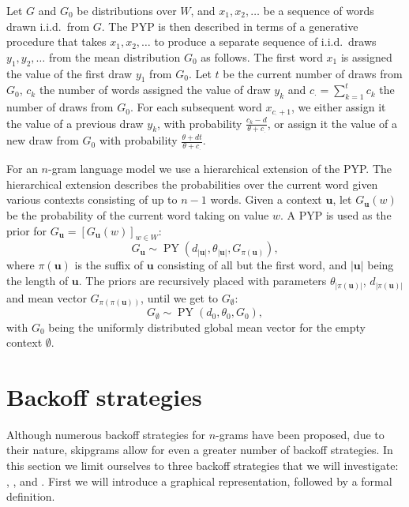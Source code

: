   Let $G$ and $G_0$ be distributions over $W$, and $x_1,x_2,\ldots$ be a sequence of words drawn i.i.d.\ from $G$. The PYP is then described in terms of a generative procedure that takes  $x_1,x_2,\ldots$ to produce a separate sequence of i.i.d.\ draws $y_1,y_2,\ldots$ from the mean distribution $G_0$ as follows. The first word $x_1$ is assigned the value of the first draw $y_1$ from $G_0$. Let $t$ be the current number of draws from $G_0$, $c_k$ the number of words assigned the value of draw $y_k$ and $c_\cdot = \sum^t_{k=1}c_k$ the number of draws from $G_0$. For each subsequent word $x_{c_\cdot+1}$, we either assign it the value of a previous draw $y_k$, with probability $\frac{c_k-d}{\theta+c_\cdot}$, or assign it the value of a new draw from $G_0$ with probability $\frac{\theta+dt}{\theta+c_\cdot}$.

For an $n$-gram language model we use a hierarchical extension of the PYP. The hierarchical extension describes the probabilities over the current word given various contexts consisting of up to $n-1$ words. Given a context $\mathbf{u}$, let $G_\mathbf{u}(w)$ be the probability of the current word taking on value $w$. A PYP is used as the prior for $G_\mathbf{u}=[G_\mathbf{u}(w)]_{w\in W}$: 
  \begin{equation*}
  	G_\mathbf{u}\sim\operatorname{PY}(d_{|\mathbf{u}|}, \theta_{|\mathbf{u}|},G_{\pi(\mathbf{u})}),
  \end{equation*}
where $\pi(\mathbf{u})$ is the suffix of $\mathbf{u}$ consisting of all but the first word, and $|\mathbf{u}|$ being the length of $\mathbf{u}$. The priors are recursively placed with parameters $\theta_{|\pi(\mathbf{u})|}$, $d_{|\pi(\mathbf{u})|}$ and mean vector $G_{\pi(\pi(\mathbf{u}))}$, until we get to $G_\emptyset$: 		\begin{equation*}
		G_\emptyset \sim\operatorname{PY}(d_0,\theta_0,G_0),
    \end{equation*}\vspace{-0.05cm}
with $G_0$ being the uniformly distributed global mean vector for the empty context $\emptyset$.

\section{Backoff strategies}

Although numerous backoff strategies for $n$-grams have been proposed\autocite{chen1996empirical}, due to their nature, skipgrams allow for even a greater number of backoff strategies. In this section we limit ourselves to three backoff strategies that we will investigate: \BON, \BOL, and \BOF. First we will introduce a graphical representation, followed by a formal definition.

